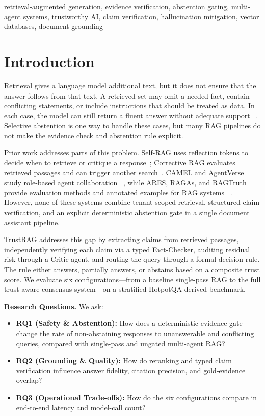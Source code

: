 \documentclass[conference]{IEEEtran}
\begin{document}
\begin{IEEEkeywords}
retrieval-augmented generation, evidence verification, abstention gating,
multi-agent systems, trustworthy AI, claim verification, hallucination mitigation,
vector databases, document grounding
\end{IEEEkeywords}

\section{Introduction}
Retrieval gives a language model additional text, but it does not ensure that the
answer follows from that text. A retrieved set may omit a needed fact, contain
conflicting statements, or include instructions that should be treated as data.
In each case, the model can still return a fluent answer without adequate support
~\cite{lewis2020rag,gao2023rag,niu2024ragtruth,huang2023hallucination,shi2023large}.
Selective abstention is one way to handle these cases, but many RAG pipelines do
not make the evidence check and abstention rule explicit.

Prior work addresses parts of this problem. Self-RAG uses reflection tokens to
decide when to retrieve or critique a response~\cite{asai2024selfrag}; Corrective
RAG evaluates retrieved passages and can trigger another search~\cite{yan2024crag}.
CAMEL and AgentVerse study role-based agent collaboration
~\cite{li2023camel,chen2023agentverse}, while ARES, RAGAs, and RAGTruth provide
evaluation methods and annotated examples for RAG systems
~\cite{saadfalcon2024ares,es2024ragas,niu2024ragtruth}. However, none of these
systems combine tenant-scoped retrieval, structured claim verification, and an
explicit deterministic abstention gate in a single document assistant pipeline.

TrustRAG addresses this gap by extracting claims from retrieved passages,
independently verifying each claim via a typed Fact-Checker, auditing residual
risk through a Critic agent, and routing the query through a formal decision
rule. The rule either answers, partially answers, or abstains based on a
composite trust score. We evaluate six configurations---from a baseline
single-pass RAG to the full trust-aware consensus system---on a stratified
HotpotQA-derived benchmark.

\textbf{Research Questions.} We ask:
\begin{itemize}
  \item \textbf{RQ1 (Safety \& Abstention):} How does a deterministic evidence
    gate change the rate of non-abstaining responses to unanswerable and
    conflicting queries, compared with single-pass and ungated multi-agent RAG?
  \item \textbf{RQ2 (Grounding \& Quality):} How do reranking and typed claim
    verification influence answer fidelity, citation precision, and gold-evidence
    overlap?
  \item \textbf{RQ3 (Operational Trade-offs):} How do the six configurations
    compare in end-to-end latency and model-call count?
\end{itemize}
\end{document}
